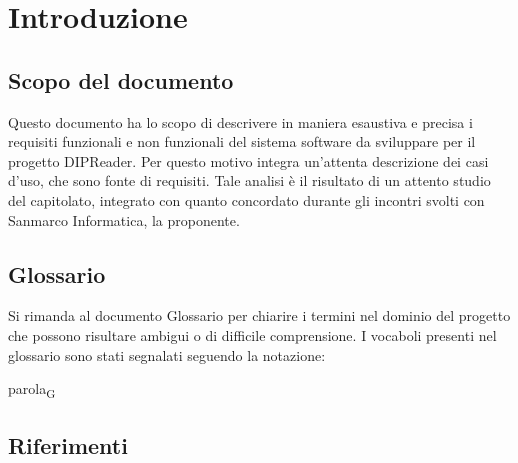 \documentclass[a4paper,12pt]{article}
\begin{document}
    \section{Introduzione} {
        \subsection{Scopo del documento} {        
            Questo documento ha lo scopo di descrivere in maniera esaustiva e precisa i requisiti funzionali e non funzionali del sistema software da sviluppare per il progetto DIPReader. Per questo motivo integra un'attenta descrizione dei casi d'uso, che sono fonte di requisiti.
            Tale analisi è il risultato di un attento studio del capitolato, integrato con quanto concordato durante gli incontri svolti con Sanmarco Informatica, la proponente.
        }
        \subsection{Glossario} {
            Si rimanda al documento Glossario per chiarire i termini nel dominio del progetto che possono risultare ambigui o di difficile comprensione. I vocaboli presenti nel glossario sono stati segnalati seguendo la notazione:
            \begin{center}
                parola\textsubscript{G}
            \end{center}
        }
        \subsection{Riferimenti} {
}}
\end{document}
